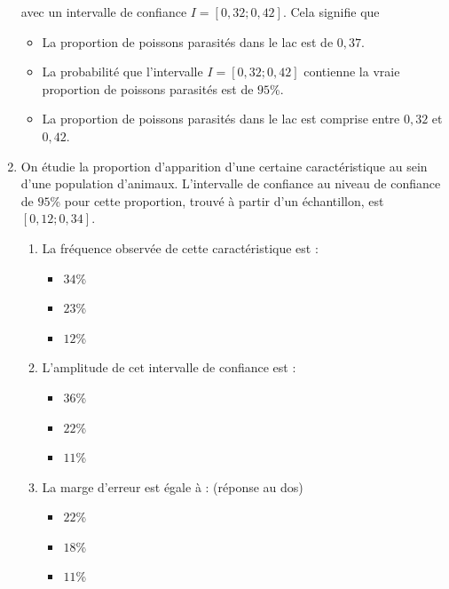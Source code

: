 \documentclass[11pt]{article}
\begin{document}
\begin{enumerate}
  avec un intervalle de confiance $I=\left[ 0,32 ; 0,42 \right]$. Cela
  signifie que
  \begin{itemize}[label=$\Box$]
    \item La proportion de poissons parasités dans le lac est de $0,37$.
    \item La probabilité que l'intervalle $I=\left[ 0,32 ; 0,42 \right]$
      contienne la vraie proportion de poissons parasités est de $95$\%.
    \item La proportion de poissons parasités dans le lac est comprise entre
      $0,32$ et $0,42$.
  \end{itemize}
\item On étudie la proportion d'apparition d'une certaine caractéristique au
  sein d'une population d'animaux. L'intervalle de confiance au niveau de
  confiance de $95$\% pour cette proportion, trouvé à partir d'un échantillon,
  est $\left[ 0,12 ; 0,34 \right]$.
  \begin{enumerate}
    \item La fréquence observée de cette caractéristique est :
      \begin{multicols}{3}
        \begin{itemize}[label=$\Box$]
          \item $34$\%
          \item $23$\%
          \item $12$\%
        \end{itemize}
      \end{multicols}
    \item L'amplitude de cet intervalle de confiance est :
      \begin{multicols}{3}
        \begin{itemize}[label=$\Box$]
          \item $36$\%
          \item $22$\%
          \item $11$\%
        \end{itemize}
      \end{multicols}
    \item La marge d'erreur est égale à : (réponse au dos)
      \begin{multicols}{3}
        \begin{itemize}[label=$\Box$]
          \item $22$\%
          \item $18$\%
          \item $11$\%
        \end{itemize}

\end{multicols}
\end{enumerate}
\end{enumerate}
\end{document}
